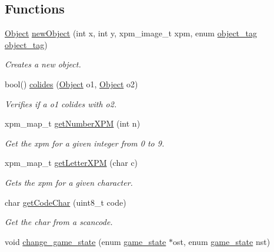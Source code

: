 \subsection*{Functions}
\begin{DoxyCompactItemize}
\item 
\hyperlink{structObject}{Object} \hyperlink{group__utils_gad24d82cbacfb1bf3af2491088d770602}{new\+Object} (int x, int y, xpm\+\_\+image\+\_\+t xpm, enum \hyperlink{group__utils_ga3eff9ebd9f241e211e00b991e2ac60fc}{object\+\_\+tag} \hyperlink{group__utils_ga3eff9ebd9f241e211e00b991e2ac60fc}{object\+\_\+tag})
\begin{DoxyCompactList}\small\item\em Creates a new object. \end{DoxyCompactList}\item 
bool() \hyperlink{group__utils_gaf433e5aeb6e9df7b15e233a2c4251577}{colides} (\hyperlink{structObject}{Object} o1, \hyperlink{structObject}{Object} o2)
\begin{DoxyCompactList}\small\item\em Verifies if a o1 colides with o2. \end{DoxyCompactList}\item 
xpm\+\_\+map\+\_\+t \hyperlink{group__utils_gaf0aa8dc23073c285e1b6b0c3ae16aefb}{get\+Number\+X\+PM} (int n)
\begin{DoxyCompactList}\small\item\em Get the xpm for a given integer from 0 to 9. \end{DoxyCompactList}\item 
xpm\+\_\+map\+\_\+t \hyperlink{group__utils_ga8e2a12eed020ad751697c4f2d1a725dc}{get\+Letter\+X\+PM} (char c)
\begin{DoxyCompactList}\small\item\em Gets the xpm for a given character. \end{DoxyCompactList}\item 
char \hyperlink{group__utils_ga7891ce0c95b80f1294517ff05b7cb962}{get\+Code\+Char} (uint8\+\_\+t code)
\begin{DoxyCompactList}\small\item\em Get the char from a scancode. \end{DoxyCompactList}\item 
void \hyperlink{group__utils_gad4300b6e93d7638f0ca14875cf7476cf}{change\+\_\+game\+\_\+state} (enum \hyperlink{group__utils_gad0ed1832dd134806ad335cdcc1a59ad2}{game\+\_\+state} $\ast$ost, enum \hyperlink{group__utils_gad0ed1832dd134806ad335cdcc1a59ad2}{game\+\_\+state} nst)

\end{DoxyCompactItemize}
